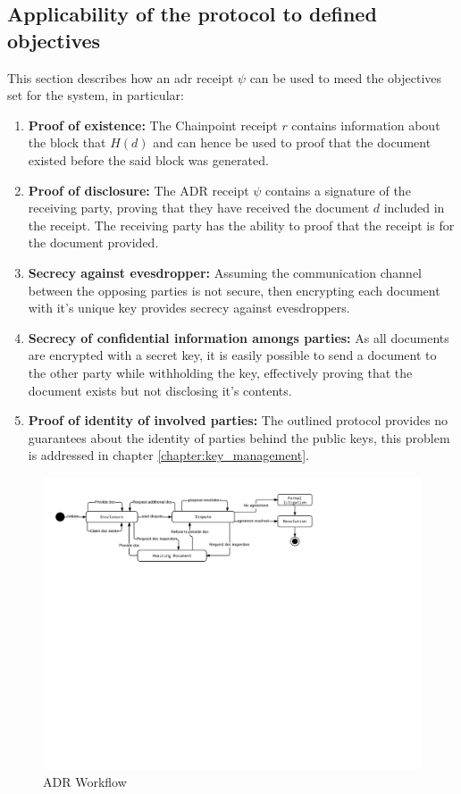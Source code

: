\documentclass[12pt,msc,a4paper,oneside]{ucl_thesis}
\begin{document}
\subsection{Applicability of the protocol to defined objectives}
This section describes how an adr receipt $\psi$ can be used to meed the objectives set for the system, in particular:
\begin{enumerate}
    \item{\textbf{Proof of existence:}} The Chainpoint receipt $r$ contains information about the block that $H(d)$ and can hence be used to proof that the document existed before the said block was generated.
    \item{\textbf{Proof of disclosure:}} The ADR receipt $\psi$ contains a signature of the receiving party, proving that they have received the document $d$ included in the receipt. The receiving party has the ability to proof that the receipt is for the document provided.
    \item{\textbf{Secrecy against evesdropper:}} Assuming the communication channel between the opposing parties is not secure, then encrypting each document with it's unique key provides secrecy against evesdroppers.
    \item{\textbf{Secrecy of confidential information amongs parties:}} As all documents are encrypted with a secret key, it is easily possible to send a document to the other party while withholding the key, effectively proving that the document exists but not disclosing it's contents.
    \item{\textbf{Proof of identity of involved parties:}} The outlined protocol provides no guarantees about the identity of parties behind the public keys, this problem is addressed in chapter \ref{chapter:key_management}.
\end{enumerate}

\begin{figure}
    \includegraphics[width=1.0\textwidth,trim={.5cm 15cm 7.5cm 1cm},clip]{./figures/adr_workflow.png}
    \caption{ADR Workflow}
    \label{fig:adr_workflow}
\end{figure}
\end{document}
